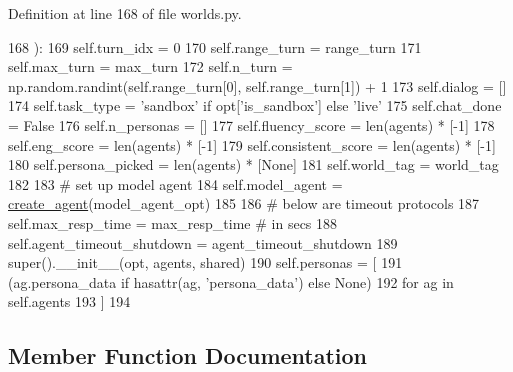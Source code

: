 Definition at line 168 of file worlds.\+py.


\begin{DoxyCode}
168     ):
169         self.turn\_idx = 0
170         self.range\_turn = range\_turn
171         self.max\_turn = max\_turn
172         self.n\_turn = np.random.randint(self.range\_turn[0], self.range\_turn[1]) + 1
173         self.dialog = []
174         self.task\_type = \textcolor{stringliteral}{'sandbox'} \textcolor{keywordflow}{if} opt[\textcolor{stringliteral}{'is\_sandbox'}] \textcolor{keywordflow}{else} \textcolor{stringliteral}{'live'}
175         self.chat\_done = \textcolor{keyword}{False}
176         self.n\_personas = []
177         self.fluency\_score = len(agents) * [-1]
178         self.eng\_score = len(agents) * [-1]
179         self.consistent\_score = len(agents) * [-1]
180         self.persona\_picked = len(agents) * [\textcolor{keywordtype}{None}]
181         self.world\_tag = world\_tag
182 
183         \textcolor{comment}{# set up model agent}
184         self.model\_agent = \hyperlink{namespaceparlai_1_1core_1_1agents_a00d77a7e26fb89e8bd900f7b2a02982a}{create\_agent}(model\_agent\_opt)
185 
186         \textcolor{comment}{# below are timeout protocols}
187         self.max\_resp\_time = max\_resp\_time  \textcolor{comment}{# in secs}
188         self.agent\_timeout\_shutdown = agent\_timeout\_shutdown
189         super().\_\_init\_\_(opt, agents, shared)
190         self.personas = [
191             (ag.persona\_data \textcolor{keywordflow}{if} hasattr(ag, \textcolor{stringliteral}{'persona\_data'}) \textcolor{keywordflow}{else} \textcolor{keywordtype}{None})
192             \textcolor{keywordflow}{for} ag \textcolor{keywordflow}{in} self.agents
193         ]
194 
\end{DoxyCode}


\subsection{Member Function Documentation}
\mbox{\label{classpersonachat__eval_1_1worlds_1_1PersonaChatEvalWorld_a679af39a8c51b3721340baea526f1f41}} 
